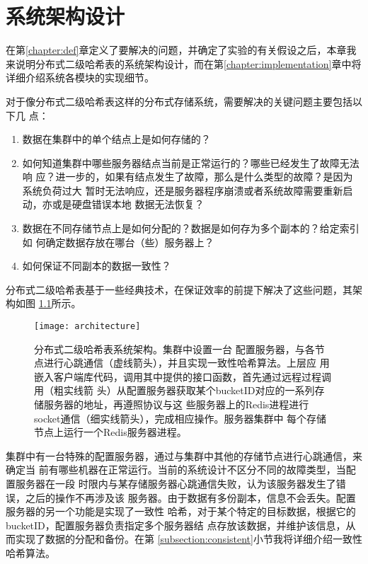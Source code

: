 \chapter{系统架构设计}\label{chapter:architecture}
在第\ref{chapter:def}章定义了要解决的问题，并确定了实验的有关假设之后，本章我
来说明分布式二级哈希表的系统架构设计，而在第\ref{chapter:implementation}章中将
详细介绍系统各模块的实现细节。

对于像分布式二级哈希表这样的分布式存储系统，需要解决的关键问题主要包括以下几
点：
\begin{enumerate}
  \item 数据在集群中的单个结点上是如何存储的？
  \item 如何知道集群中哪些服务器结点当前是正常运行的？哪些已经发生了故障无法响
  应？进一步的，如果有结点发生了故障，那么是什么类型的故障？是因为系统负荷过大
  暂时无法响应，还是服务器程序崩溃或者系统故障需要重新启动，亦或是硬盘错误本地
  数据无法恢复？
  \item 数据在不同存储节点上是如何分配的？数据是如何存为多个副本的？给定索引如
  何确定数据存放在哪台（些）服务器上？
  \item 如何保证不同副本的数据一致性？
\end{enumerate}
分布式二级哈希表基于一些经典技术，在保证效率的前提下解决了这些问题，其架构如图
\ref{figure:architecture}所示。
\begin{figure}[htb]
  \centering
  \texttt{[image: architecture]}
  \caption[分布式二级哈希表系统架构]{分布式二级哈希表系统架构。集群中设置一台
  配置服务器，与各节点进行心跳通信（虚线箭头），并且实现一致性哈希算法。上层应
  用嵌入客户端库代码，调用其中提供的接口函数，首先通过远程过程调用（粗实线箭
  头）从配置服务器获取某个bucketID对应的一系列存储服务器的地址，再遵照协议与这
  些服务器上的Redis进程进行socket通信（细实线箭头），完成相应操作。服务器集群中
  每个存储节点上运行一个Redis服务器进程。}
  \label{figure:architecture}
\end{figure}

集群中有一台特殊的配置服务器，通过与集群中其他的存储节点进行心跳通信，来确定当
前有哪些机器在正常运行。当前的系统设计不区分不同的故障类型，当配置服务器在一段
时限内与某存储服务器心跳通信失败，认为该服务器发生了错误，之后的操作不再涉及该
服务器。由于数据有多份副本，信息不会丢失。配置服务器的另一个功能是实现了一致性
哈希，对于某个特定的目标数据，根据它的bucketID，配置服务器负责指定多个服务器结
点存放该数据，并维护该信息，从而实现了数据的分配和备份。在第
\ref{subsection:consistent}小节我将详细介绍一致性哈希算法。

